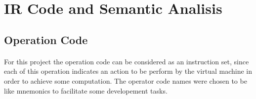 \section{IR Code and Semantic Analisis}
\subsection{Operation Code}
\paragraph{} For this project the operation code can be considered as an
instruction set, since each of this operation indicates an action to be perform
by the virtual machine in order to achieve some computation. The operator code
names were chosen to be like mnemonics to facilitate some developement tasks.

